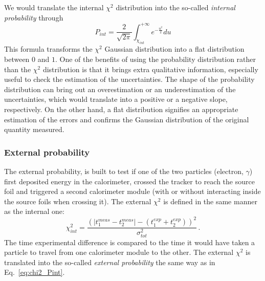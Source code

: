 We would translate the internal $\chi^{2}$ distribution into the so-called \emph{internal probability} through
\begin{equation}
  P_{int} = \frac{2}{\sqrt{2\pi}}\int_{\chi_{int}}^{+ \infty} e^{-\frac{u^{2}}{2}} du %
  \label{eq:chi2_Pint}
\end{equation}
This formula transforms the $\chi^{2}$ Gaussian distribution into a flat distribution between $0$ and $1$.
One of the benefits of using the probability distribution rather than the $\chi^{2}$ distribution is that it brings extra qualitative information, especially useful to check the estimation of the uncertainties.
The shape of the probability distribution can bring out an overestimation or an underestimation of the uncertainties, which would translate into a positive or a negative slope, respectively.
On the other hand, a flat distribution signifies an appropriate estimation of the errors and confirms the Gaussian distribution of the original quantity measured.



\subsubsection{External probability}

The external probability, is built to test if one of the two particles (electron, $\gamma$) first deposited energy in the calorimeter, crossed the tracker to reach the source foil and triggered a second calorimeter module (with or without interacting inside the source foils when crossing it).
The external $\chi^{2}$ is defined in the same manner as the internal one:
\begin{equation}
  \chi^{2}_{int}=\frac{(|t^{meas}_{1} - t^{meas}_{2}| - (t^{exp}_{1} + t^{exp}_{2}))^{2}}{\sigma_{tot}^{2}}\,.
  \label{eq:ext_chi2}
\end{equation}
The time experimental difference is compared to the time it would have taken a particle to travel from one calorimeter module to the other.
The external $\chi^{2}$ is translated into the so-called \emph{external probability} the same way as in Eq.~\eqref{eq:chi2_Pint}.

